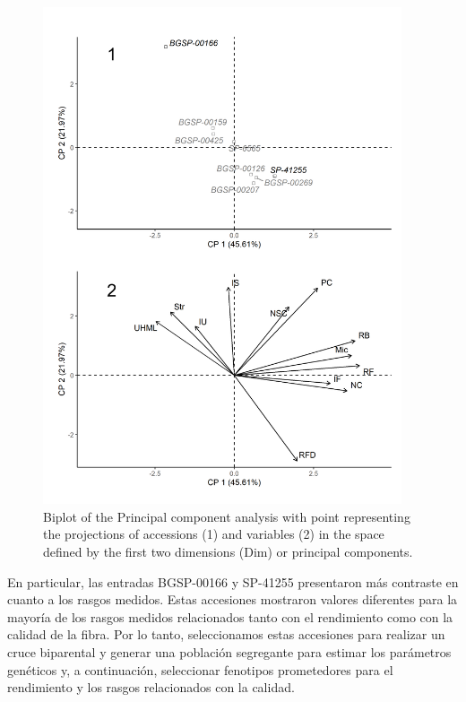 \documentclass[12pt,oneside]{reedthesis}
\begin{document}
\begin{figure}
\includegraphics[width=400px]{figure/chap1/Para_compuestas/PCA_juntas} \caption{Biplot of the Principal component analysis with point representing the projections of accessions (1) and variables (2) in the space defined by the first two dimensions (Dim) or principal components.}\label{fig:img-PC}
\end{figure}

En particular, las entradas BGSP-00166 y SP-41255 presentaron más contraste en cuanto a los rasgos medidos. Estas accesiones mostraron valores diferentes para la mayoría de los rasgos medidos relacionados tanto con el rendimiento como con la calidad de la fibra. Por lo tanto, seleccionamos estas accesiones para realizar un cruce biparental y generar una población segregante para estimar los parámetros genéticos y, a continuación, seleccionar fenotipos prometedores para el rendimiento y los rasgos relacionados con la calidad.
\end{document}
